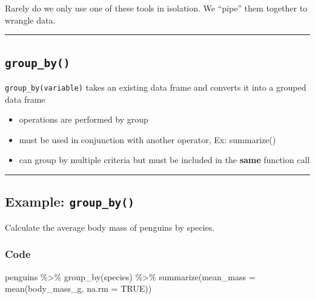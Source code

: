 \documentclass[
  letterpaper,
  DIV=11,
  numbers=noendperiod]{scrreprt}
\newenvironment{Shaded}{\begin{snugshade}}{\end{snugshade}}
\newcommand{\AttributeTok}[1]{\textcolor[rgb]{0.40,0.45,0.13}{#1}}
\newcommand{\ConstantTok}[1]{\textcolor[rgb]{0.56,0.35,0.01}{#1}}
\newcommand{\FunctionTok}[1]{\textcolor[rgb]{0.28,0.35,0.67}{#1}}
\newcommand{\NormalTok}[1]{\textcolor[rgb]{0.00,0.23,0.31}{#1}}
\newcommand{\SpecialCharTok}[1]{\textcolor[rgb]{0.37,0.37,0.37}{#1}}
\providecommand{\tightlist}{%
  \setlength{\itemsep}{0pt}\setlength{\parskip}{0pt}}\usepackage{longtable,booktabs,array}
\begin{document}
Rarely do we only use one of these tools in isolation. We ``pipe'' them
together to wrangle data.

\begin{center}\rule{0.5\linewidth}{0.5pt}\end{center}

\hypertarget{group_by}{%
\subsection*{\texorpdfstring{\texttt{group\_by()}}{group\_by()}}\label{group_by}}

\texttt{group\_by(variable)} takes an existing data frame and converts
it into a grouped data frame

\begin{itemize}
\tightlist
\item
  operations are performed by group
\item
  must be used in conjunction with another operator, Ex: summarize()
\item
  can group by multiple criteria but must be included in the
  \textbf{same} function call
\end{itemize}

\begin{center}\rule{0.5\linewidth}{0.5pt}\end{center}

\hypertarget{example-group_by}{%
\subsection*{\texorpdfstring{Example:
\texttt{group\_by()}}{Example: group\_by()}}\label{example-group_by}}

Calculate the average body mass of penguins by species.

\hypertarget{code-6}{%
\subsubsection*{Code}\label{code-6}}

\begin{Shaded}
\begin{Highlighting}[]
\NormalTok{penguins }\SpecialCharTok{\%\textgreater{}\%} 
  \FunctionTok{group\_by}\NormalTok{(species) }\SpecialCharTok{\%\textgreater{}\%} 
  \FunctionTok{summarize}\NormalTok{(}\AttributeTok{mean\_mass =} \FunctionTok{mean}\NormalTok{(body\_mass\_g, }\AttributeTok{na.rm =} \ConstantTok{TRUE}\NormalTok{))}
\end{Highlighting}
\end{Shaded}
\end{document}
